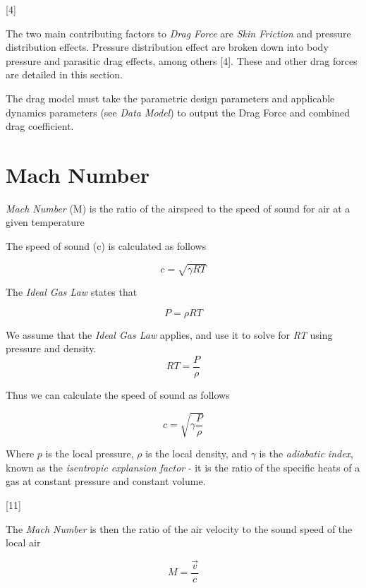 \documentclass[]{book}
\begin{document}
{[}4{]}

The two main contributing factors to \emph{Drag Force} are \emph{Skin
Friction} and pressure distribution effects. Pressure distribution
effect are broken down into body pressure and parasitic drag effects,
among others {[}4{]}. These and other drag forces are detailed in this
section.

The drag model must take the parametric design parameters and applicable
dynamics parameters (see \emph{Data Model}) to output the Drag Force and
combined drag coefficient.

\section{Mach Number}\label{mach-number}

\emph{Mach Number} (M) is the ratio of the airspeed to the speed of
sound for air at a given temperature

The speed of sound (c) is calculated as follows

\begin{equation}
c = \sqrt{\gamma R T } 
\end{equation}

The \emph{Ideal Gas Law} states that

\begin{equation}
\label{ideal_gas_law}
P = \rho R T
\end{equation}

We assume that the \emph{Ideal Gas Law} applies, and use it to solve for
\emph{RT} using pressure and density. \[ RT = \dfrac{P}{\rho} \]

Thus we can calculate the speed of sound as follows

\begin{equation}
\label{speed_of_sound}
c = \sqrt{\gamma \dfrac{P}{\rho} } 
\end{equation}

Where \(p\) is the local pressure, \(\rho\) is the local density, and
\(\gamma\) is the \emph{adiabatic index}, known as the \emph{isentropic
explansion factor} - it is the ratio of the specific heats of a gas at
constant pressure and constant volume.

{[}11{]}

The \emph{Mach Number} is then the ratio of the air velocity to the
sound speed of the local air

\begin{equation}
M = \dfrac{ \vec{v} } { c }
\end{equation}
\end{document}
